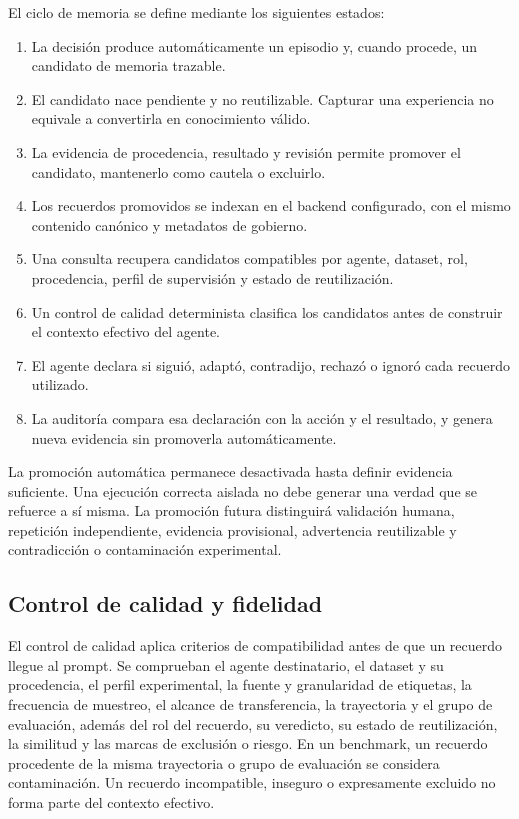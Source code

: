 El ciclo de memoria se define mediante los siguientes estados:

\begin{enumerate}
  \item La decisión produce automáticamente un episodio y, cuando procede, un
        candidato de memoria trazable.
  \item El candidato nace pendiente y no reutilizable. Capturar una experiencia
        no equivale a convertirla en conocimiento válido.
  \item La evidencia de procedencia, resultado y revisión permite promover el
        candidato, mantenerlo como cautela o excluirlo.
  \item Los recuerdos promovidos se indexan en el backend configurado, con el
        mismo contenido canónico y metadatos de gobierno.
  \item Una consulta recupera candidatos compatibles por agente, dataset, rol,
        procedencia, perfil de supervisión y estado de reutilización.
  \item Un control de calidad determinista clasifica los candidatos antes de
        construir el contexto efectivo del agente.
  \item El agente declara si siguió, adaptó, contradijo, rechazó o ignoró cada
        recuerdo utilizado.
  \item La auditoría compara esa declaración con la acción y el resultado, y
        genera nueva evidencia sin promoverla automáticamente.
\end{enumerate}

La promoción automática permanece desactivada hasta definir evidencia
suficiente. Una ejecución correcta aislada no debe generar una verdad que se
refuerce a sí misma. La promoción futura distinguirá validación humana,
repetición independiente, evidencia provisional, advertencia reutilizable y
contradicción o contaminación experimental.

\subsection{Control de calidad y fidelidad}

El control de calidad aplica criterios de compatibilidad antes de que un
recuerdo llegue al prompt. Se comprueban el agente destinatario, el dataset y su
procedencia, el perfil experimental, la fuente y granularidad de etiquetas, la
frecuencia de muestreo, el alcance de transferencia, la trayectoria y el grupo
de evaluación, además del rol del recuerdo, su veredicto, su estado de
reutilización, la similitud y las marcas de exclusión o riesgo. En un benchmark,
un recuerdo procedente de la misma trayectoria o grupo de evaluación se
considera contaminación. Un recuerdo incompatible, inseguro o expresamente
excluido no forma parte del contexto efectivo.


